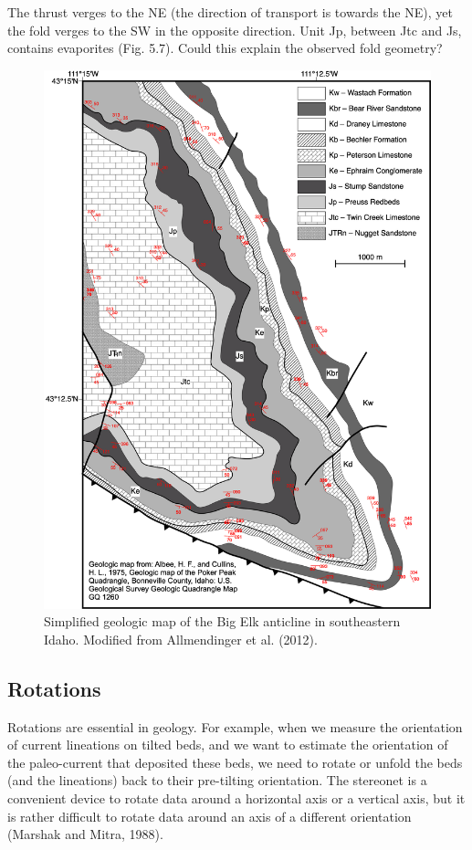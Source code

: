 \documentclass[a4paper , 12pt]{book}
\begin{document}
The thrust verges to the NE (the direction of transport is towards the NE), yet the fold verges to the SW in the opposite direction. Unit Jp, between Jtc and Js, contains evaporites (Fig. 5.7). Could this explain the observed fold geometry?

\begin{figure}[H]
    \centering
    \includegraphics[width=14cm]{Figures/ch5f8.png}
    \caption{Simplified geologic map of the Big Elk anticline in southeastern Idaho. Modified from Allmendinger et al. (2012).}
\end{figure}

\subsection{Rotations}

Rotations are essential in geology. For example, when we measure the orientation of current lineations on tilted beds, and we want to estimate the orientation of the paleo-current that deposited these beds, we need to rotate or unfold the beds (and the lineations) back to their pre-tilting orientation. The stereonet is a convenient device to rotate data around a horizontal axis or a vertical axis, but it is rather difficult to rotate data around an axis of a different orientation (Marshak and Mitra, 1988). 
\end{document}

